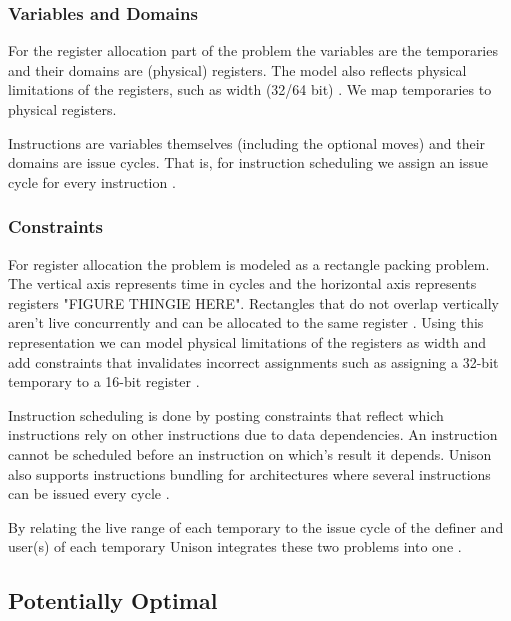 \subsubsection{Variables and Domains}

For the register allocation part of the problem the variables are the temporaries and their
domains are (physical) registers. The model also reflects physical limitations of the
registers, such as width (32/64 bit) \cite[Section~3]{reg-alloc-inst-sched-uni}. We map
temporaries to physical registers.

Instructions are variables themselves (including the optional moves) and their domains
are issue cycles. That is, for instruction scheduling we assign an issue cycle for every
instruction \cite[Section~3]{reg-alloc-inst-sched-uni}.

\subsubsection{Constraints}

For register allocation the problem is modeled as a rectangle packing problem. The vertical
axis represents time in cycles and the horizontal axis represents registers "FIGURE THINGIE
HERE". Rectangles that do not overlap vertically aren't live concurrently and can be
allocated to the same register \cite[Section~4.1]{constraint-based}. Using this representation
we can model physical limitations of the registers as width and add constraints that invalidates
incorrect assignments such as assigning a 32-bit temporary to a 16-bit register \cite
[Section~4.3]{constraint-based}.

Instruction scheduling is done by posting constraints that reflect which instructions rely
on other instructions due to data dependencies. An instruction cannot be scheduled before
an instruction on which's result it depends. Unison also supports instructions bundling for
architectures where several instructions can be issued every cycle \cite[Section~5]{constraint-based}.

By relating the live range of each temporary to the issue cycle of the definer and user(s)
of each temporary Unison integrates these two problems into one \cite{reg-alloc-inst-sched-uni}.

\subsection{Potentially Optimal}

